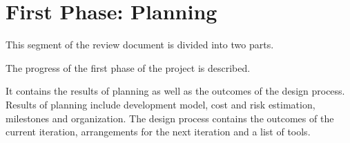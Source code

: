 \section{First Phase: Planning}
This segment of the review document is divided into two parts.

The progress of the first phase of the project is described.

It contains the results of planning as well as the outcomes of the design process.
Results of planning include development model, cost and risk estimation, milestones and organization.
The design process contains the outcomes of the current iteration, arrangements for the next iteration and a list of tools.


